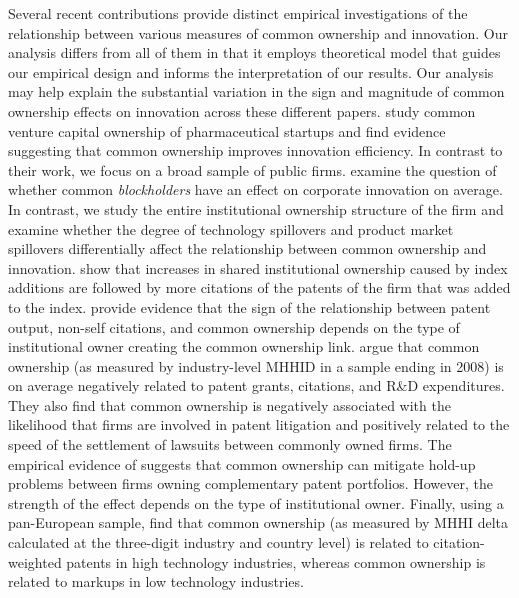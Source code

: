 \documentclass[12pt]{article}
\begin{document}
Several recent contributions provide distinct empirical investigations of the relationship between various measures of common ownership and innovation. Our analysis differs from all of them in that it employs theoretical model that guides our empirical design and informs the interpretation of our results. Our analysis may help explain the substantial variation in the sign and magnitude of common ownership effects on innovation across these different papers. \cite{li2020venture} study common venture capital ownership of pharmaceutical startups and find evidence suggesting that common ownership improves innovation efficiency. In contrast to their work, we focus on a broad sample of public firms. \cite{he2017product} examine the question of whether common \emph{blockholders} have an effect on corporate innovation on average. In contrast, we study the entire institutional ownership structure of the firm and examine whether the degree of technology spillovers and product market spillovers differentially affect the relationship between common ownership and innovation. \cite{kostovetsky2020common} show that increases in shared institutional ownership caused by index additions are followed by more citations of the patents of the firm that was added to the index. \cite{borochin2020common} provide evidence that the sign of the relationship between patent output, non-self citations, and common ownership depends on the type of institutional owner creating the common ownership link. \cite{chiao2020corporate} argue that common ownership (as measured by industry-level MHHID in a sample ending in 2008) is on average negatively related to patent grants, citations, and R\&D expenditures. They also find that common ownership is negatively associated with the likelihood that firms are involved in patent litigation and positively related to the speed of the settlement of lawsuits between commonly owned firms. The empirical evidence of \cite{geng2016technological} suggests that common ownership can mitigate hold-up problems between firms owning complementary patent portfolios. However, the strength of the effect depends on the type of institutional owner. Finally, using a pan-European sample, \cite{gibbon2021rising} find that common ownership (as measured by MHHI delta calculated at the three-digit industry and country level) is related to citation-weighted patents in high technology industries, whereas common ownership is related to markups in low technology industries.
\end{document}
